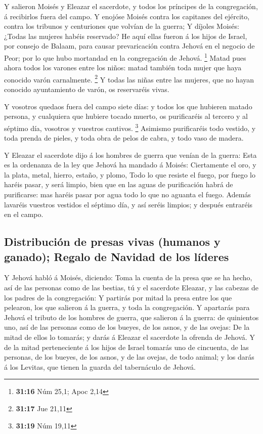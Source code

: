  Y salieron Moisés y Eleazar el sacerdote, y todos los
príncipes de la congregación, á recibirlos fuera del campo.
 Y enojóse Moisés contra los capitanes del ejército, contra
los tribunos y centuriones que volvían de la guerra;  Y
díjoles Moisés: ¿Todas las mujeres habéis reservado?  He
aquí ellas fueron á los hijos de Israel, por consejo de Balaam, para
causar prevaricación contra Jehová en el negocio de Peor; por lo que
hubo mortandad en la congregación de Jehová. \footnote{\textbf{31:16}
  Núm 25,1; Apoc 2,14}  Matad pues ahora todos los varones
entre los niños: matad también toda mujer que haya conocido varón
carnalmente. \footnote{\textbf{31:17} Jue 21,11}  Y todas
las niñas entre las mujeres, que no hayan conocido ayuntamiento de
varón, os reservaréis vivas.

 Y vosotros quedaos fuera del campo siete días: y todos los
que hubieren matado persona, y cualquiera que hubiere tocado muerto, os
purificaréis al tercero y al séptimo día, vosotros y vuestros cautivos.
\footnote{\textbf{31:19} Núm 19,11}  Asimismo purificaréis
todo vestido, y toda prenda de pieles, y toda obra de pelos de cabra, y
todo vaso de madera.

 Y Eleazar el sacerdote dijo á los hombres de guerra que
venían de la guerra: Esta es la ordenanza de la ley que Jehová ha
mandado á Moisés:  Ciertamente el oro, y la plata, metal,
hierro, estaño, y plomo,  Todo lo que resiste el fuego, por
fuego lo haréis pasar, y será limpio, bien que en las aguas de
purificación habrá de purificarse: mas haréis pasar por agua todo lo que
no aguanta el fuego.  Además lavaréis vuestros vestidos el
séptimo día, y así seréis limpios; y después entraréis en el campo.

\hypertarget{distribuciuxf3n-de-presas-vivas-humanos-y-ganado-regalo-de-navidad-de-los-luxedderes}{%
\subsection{Distribución de presas vivas (humanos y ganado); Regalo de
Navidad de los
líderes}\label{distribuciuxf3n-de-presas-vivas-humanos-y-ganado-regalo-de-navidad-de-los-luxedderes}}

 Y Jehová habló á Moisés, diciendo:  Toma la
cuenta de la presa que se ha hecho, así de las personas como de las
bestias, tú y el sacerdote Eleazar, y las cabezas de los padres de la
congregación:  Y partirás por mitad la presa entre los que
pelearon, los que salieron á la guerra, y toda la congregación.
 Y apartarás para Jehová el tributo de los hombres de
guerra, que salieron á la guerra: de quinientos uno, así de las personas
como de los bueyes, de los asnos, y de las ovejas:  De la
mitad de ellos lo tomarás; y darás á Eleazar el sacerdote la ofrenda de
Jehová.  Y de la mitad perteneciente á los hijos de Israel
tomarás uno de cincuenta, de las personas, de los bueyes, de los asnos,
y de las ovejas, de todo animal; y los darás á los Levitas, que tienen
la guarda del tabernáculo de Jehová.

